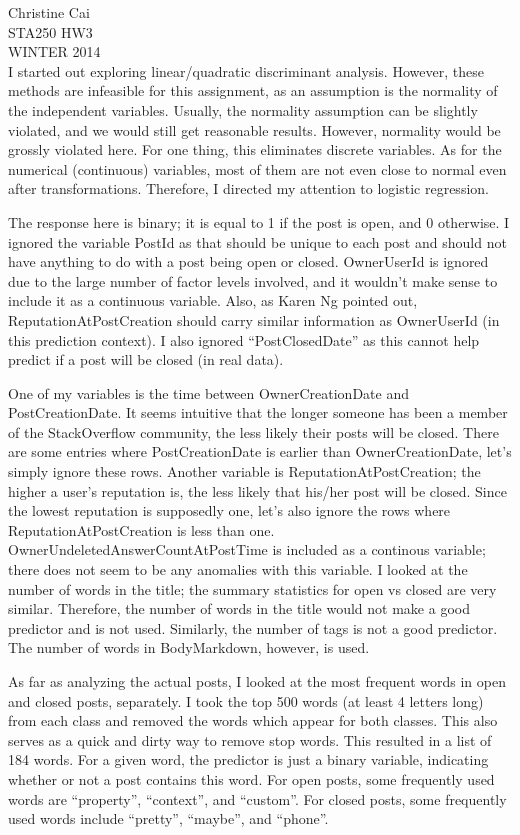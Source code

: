 \documentclass[12pt]{article}
\begin{document}
\noindent Christine Cai\\
STA250 HW3\\
WINTER 2014\\

I started out exploring linear/quadratic discriminant analysis. However, these methods are infeasible for this assignment, as an assumption is the normality of the independent variables. Usually, the normality assumption can be slightly violated, and we would still get reasonable results. However, normality would be grossly violated here. For one thing, this eliminates discrete variables. As for the numerical (continuous) variables, most of them are not even close to normal even after transformations. Therefore, I directed my attention to logistic regression.

The response here is binary; it is equal to 1 if the post is open, and 0 otherwise. I ignored the variable PostId as that should be unique to each post and should not have anything to do with a post being open or closed. OwnerUserId is ignored due to the large number of factor levels involved, and it wouldn't make sense to include it as a continuous variable. Also, as Karen Ng pointed out, ReputationAtPostCreation should carry similar information as OwnerUserId (in this prediction context). I also ignored ``PostClosedDate'' as this cannot help predict if a post will be closed (in real data).

One of my variables is the time between OwnerCreationDate and PostCreationDate. It seems intuitive that the longer someone has been a member of the StackOverflow community, the less likely their posts will be closed. There are some entries where PostCreationDate is earlier than OwnerCreationDate, let's simply ignore these rows. Another variable is ReputationAtPostCreation; the higher a user's reputation is, the less likely that his/her post will be closed. Since the lowest reputation is supposedly one, let's also ignore the rows where ReputationAtPostCreation is less than one. OwnerUndeletedAnswerCountAtPostTime is included as a continous variable; there does not seem to be any anomalies with this variable. I looked at the number of words in the title; the summary statistics for open vs closed are very similar. Therefore, the number of words in the title would not make a good predictor and is not used. Similarly, the number of tags is not a good predictor. The number of words in BodyMarkdown, however, is used.

As far as analyzing the actual posts, I looked at the most frequent words in open and closed posts, separately. I took the top 500 words (at least 4 letters long) from each class and removed the words which appear for both classes. This also serves as a quick and dirty way to remove stop words. This resulted in a list of 184 words. For a given word, the predictor is just a binary variable, indicating whether or not a post contains this word. For open posts, some frequently used words are ``property'', ``context'', and ``custom''. For closed posts, some frequently used words include ``pretty'', ``maybe'', and ``phone''.
\end{document}
